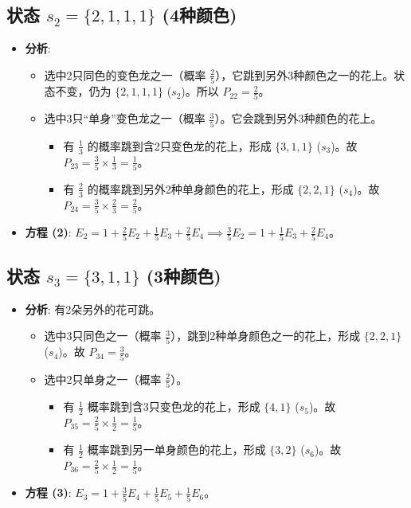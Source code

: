 \documentclass[UTF8]{ctexart}
\begin{document}
\subsection*{状态 $s_2 = \{2, 1, 1, 1\}$ (4种颜色)}
\begin{itemize}
    \item \textbf{分析}:
        \begin{itemize}
            \item 选中2只同色的变色龙之一（概率 $\frac{2}{5}$），它跳到另外3种颜色之一的花上。状态不变，仍为 $\{2,1,1,1\}$ ($s_2$)。所以 $P_{22} = \frac{2}{5}$。
            \item 选中3只“单身”变色龙之一（概率 $\frac{3}{5}$）。它会跳到另外3种颜色的花上。
                \begin{itemize}
                    \item 有 $\frac{1}{3}$ 的概率跳到含2只变色龙的花上，形成 $\{3,1,1\}$ ($s_3$)。故 $P_{23} = \frac{3}{5} \times \frac{1}{3} = \frac{1}{5}$。
                    \item 有 $\frac{2}{3}$ 的概率跳到另外2种单身颜色的花上，形成 $\{2,2,1\}$ ($s_4$)。故 $P_{24} = \frac{3}{5} \times \frac{2}{3} = \frac{2}{5}$。
                \end{itemize}
        \end{itemize}
    \item \textbf{方程 (2)}: $E_2 = 1 + \frac{2}{5}E_2 + \frac{1}{5}E_3 + \frac{2}{5}E_4 \implies \frac{3}{5}E_2 = 1 + \frac{1}{5}E_3 + \frac{2}{5}E_4$。
\end{itemize}

\subsection*{状态 $s_3 = \{3, 1, 1\}$ (3种颜色)}
\begin{itemize}
    \item \textbf{分析}: 有2朵另外的花可跳。
        \begin{itemize}
            \item 选中3只同色之一（概率 $\frac{3}{5}$），跳到2种单身颜色之一的花上，形成 $\{2,2,1\}$ ($s_4$)。故 $P_{34} = \frac{3}{5}$。
            \item 选中2只单身之一（概率 $\frac{2}{5}$）。
                \begin{itemize}
                    \item 有 $\frac{1}{2}$ 概率跳到含3只变色龙的花上，形成 $\{4,1\}$ ($s_5$)。故 $P_{35} = \frac{2}{5} \times \frac{1}{2} = \frac{1}{5}$。
                    \item 有 $\frac{1}{2}$ 概率跳到另一单身颜色的花上，形成 $\{3,2\}$ ($s_6$)。故 $P_{36} = \frac{2}{5} \times \frac{1}{2} = \frac{1}{5}$。
                \end{itemize}
        \end{itemize}
    \item \textbf{方程 (3)}: $E_3 = 1 + \frac{3}{5}E_4 + \frac{1}{5}E_5 + \frac{1}{5}E_6$。
\end{itemize}
\end{document}
